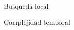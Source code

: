 \begin{section}{Busqueda local}
		\begin{subsection}{Complejidad temporal}
		\end{subsection}

\end{section}
